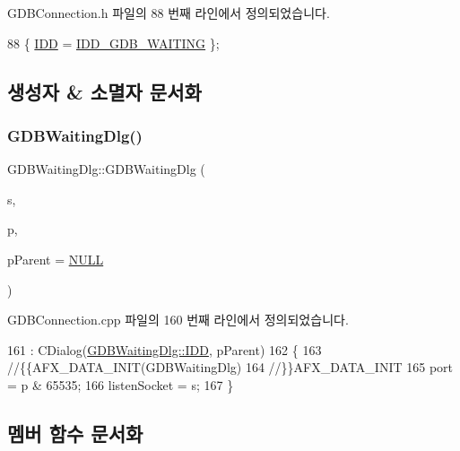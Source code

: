 G\+D\+B\+Connection.\+h 파일의 88 번째 라인에서 정의되었습니다.


\begin{DoxyCode}
88 \{ \mbox{\hyperlink{class_g_d_b_waiting_dlg_aa533de8ec8419795c0d1572d637c9101a46edec94a924f41c80746b5923deab43}{IDD}} = \mbox{\hyperlink{resource_8h_a7cff75edb2c5fa4f91c20c17e57aa3fc}{IDD\_GDB\_WAITING}} \};
\end{DoxyCode}


\subsection{생성자 \& 소멸자 문서화}
\mbox{\label{class_g_d_b_waiting_dlg_ad71a7ff67a8f328efb264ac69af7cd8f}} 
\subsubsection{\texorpdfstring{G\+D\+B\+Waiting\+Dlg()}{GDBWaitingDlg()}}
{\footnotesize\ttfamily G\+D\+B\+Waiting\+Dlg\+::\+G\+D\+B\+Waiting\+Dlg (\begin{DoxyParamCaption}\item[{\mbox{\hyperlink{remote_8cpp_aff55fe551a9992a54ec54621c524d0a4}{S\+O\+C\+K\+ET}}}]{s,  }\item[{\mbox{\hyperlink{_util_8cpp_a0ef32aa8672df19503a49fab2d0c8071}{int}}}]{p,  }\item[{C\+Wnd $\ast$}]{p\+Parent = {\ttfamily \mbox{\hyperlink{_system_8h_a070d2ce7b6bb7e5c05602aa8c308d0c4}{N\+U\+LL}}} }\end{DoxyParamCaption})}



G\+D\+B\+Connection.\+cpp 파일의 160 번째 라인에서 정의되었습니다.


\begin{DoxyCode}
161   : CDialog(\mbox{\hyperlink{class_g_d_b_waiting_dlg_aa533de8ec8419795c0d1572d637c9101a46edec94a924f41c80746b5923deab43}{GDBWaitingDlg::IDD}}, pParent)
162 \{
163   \textcolor{comment}{//\{\{AFX\_DATA\_INIT(GDBWaitingDlg)}
164   \textcolor{comment}{//\}\}AFX\_DATA\_INIT}
165   port = p & 65535;
166   listenSocket = s;
167 \}
\end{DoxyCode}


\subsection{멤버 함수 문서화}
\mbox{\label{class_g_d_b_waiting_dlg_af600ff1c657c7db6c325a5276328a4a0}} 
